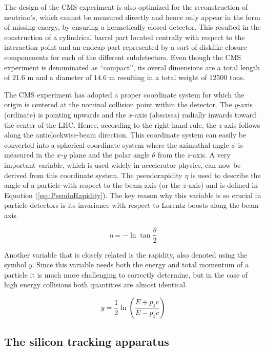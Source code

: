 The design of the CMS experiment is also optimized for the reconstruction of neutrino's, which cannot be measured directly and hence only appear in the form of missing energy, by ensuring a hermetically closed detector. This resulted in the construction of a cylindrical barrel part located centrally with respect to the interaction point and an endcap part represented by a sort of disklike closure componenents for each of the different subdetectors.
Even though the CMS experiment is denominated as ``compact'', its overal dimensions are a total length of $21.6$ m and a diameter of $14.6$ m resulting in a total weight of $12500$ tons.

The CMS experiment has adopted a proper coordinate system for which the origin is centered at the nominal collision point within the detector. The $y$-axis (ordinate) is pointing upwards and the $x$-axis (abscissa) radially inwards toward the center of the LHC. Hence, according to the right-hand rule, the $z$-axis follows along the anticlockwise-beam direction. This coordinate system can easily be converted into a spherical coordinate system where the azimuthal angle $\phi$ is measured in the $x$-$y$ plane and the polar angle $\theta$ from the $z$-axis. 
A very important variable, which is used widely in accelerator physics, can now be derived from this coordinate system. The pseudorapidity $\eta$ is used to describe the angle of a particle with respect to the beam axis (or the $z$-axis) and is defined in Equation (\ref{eq::PseudoRapidity}). The key reason why this variable is so crucial in particle detectors is its invariance with respect to Lorentz boosts along the beam axis.

\begin{equation} \label{eq::PseudoRapidity}
 \eta = - \ln \tan \frac{\theta}{2}
\end{equation}

Another variable that is closely related is the rapidity, also denoted using the symbol $y$. Since this variable needs both the energy and total momentum of a particle it is much more challenging to correctly determine, but in the case of high energy collisions both quantities are almost identical.

\begin{equation}
 y = \frac{1}{2} \ln \left( \frac{E+p_{z}c}{E - p_{z}c} \right)
\end{equation}

\subsection{The silicon tracking apparatus}

